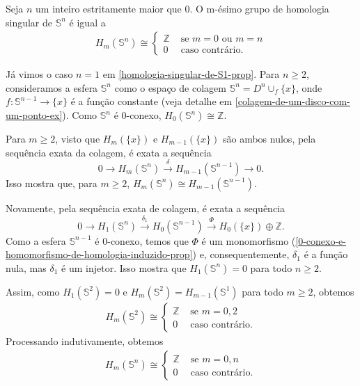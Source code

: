 \begin{prop}
    Seja $n$ um inteiro estritamente maior que $0$. O m-ésimo grupo de homologia singular de $\mathbb{S}^n$ é igual a  
    \begin{align*}
        H_m(\mathbb{S}^n)\cong\begin{cases}
            \mathbb{Z}&\text{ se }m=0\text{ ou }m=n\\
            0&\text{ caso contrário.}
        \end{cases}
    \end{align*}
\end{prop}

\begin{dem}
    Já vimos o caso $n=1$ em \ref{homologia-singular-de-S1-prop}. Para $n\ge 2$, consideramos a esfera $\mathbb{S}^n$ como o espaço de colagem $\mathbb{S}^n=D^n\cup_f\{x\}$, onde $f:\mathbb{S}^{n-1}\rightarrow \{x\}$ é a função constante (veja detalhe em \ref{colagem-de-um-disco-com-um-ponto-ex}). Como $\mathbb{S}^n$ é 0-conexo, $H_0(\mathbb{S}^n)\cong \mathbb{Z}$.
    
    Para $m\ge 2$, visto que $H_m(\{x\})$ e $H_{m-1}(\{x\})$ são ambos nulos, pela sequência exata da colagem, é exata a sequência 
    \[0\rightarrow H_m(\mathbb{S}^n)\xrightarrow{\delta} H_{m-1}(\mathbb{S}^{n-1})\rightarrow 0.\]
    Isso mostra que, para $m\ge 2$, $H_m(\mathbb{S}^n)\cong H_{m-1}(\mathbb{S}^{n-1}).$

    Novamente, pela sequência exata de colagem, é exata a sequência 
    \[0\rightarrow H_1(\mathbb{S}^n)\xrightarrow{\delta_1} H_0(\mathbb{S}^{n-1})\xrightarrow{\Phi} H_0(\{x\})\oplus \mathbb{Z}.\]
    Como a esfera $\mathbb{S}^{n-1}$ é 0-conexo, temos que $\Phi$ é um monomorfismo (\ref{0-conexo-e-homomorfismo-de-homologia-induzido-prop}) e, consequentemente, $\delta_1$ é a função nula, mas $\delta_1$ é um injetor. Isso mostra que $H_1(\mathbb{S}^n)=0$ para todo $n\ge 2$.

    Assim, como $H_1(\mathbb{S}^2)=0$ e $H_m(\mathbb{S}^2)=H_{m-1}(\mathbb{S}^1)$ para todo $m\ge 2$, obtemos 
    \begin{align*}
        H_m(\mathbb{S}^2)\cong\begin{cases}
            \mathbb{Z}&\text{ se }m=0,2\\
            0&\text{ caso contrário.}
        \end{cases}
    \end{align*}
    Processando indutivamente, obtemos 
    \begin{align*}
        H_m(\mathbb{S}^n)\cong\begin{cases}
            \mathbb{Z}&\text{ se }m=0,n\\
            0&\text{ caso contrário.}
        \end{cases}
    \end{align*}
\end{dem}

